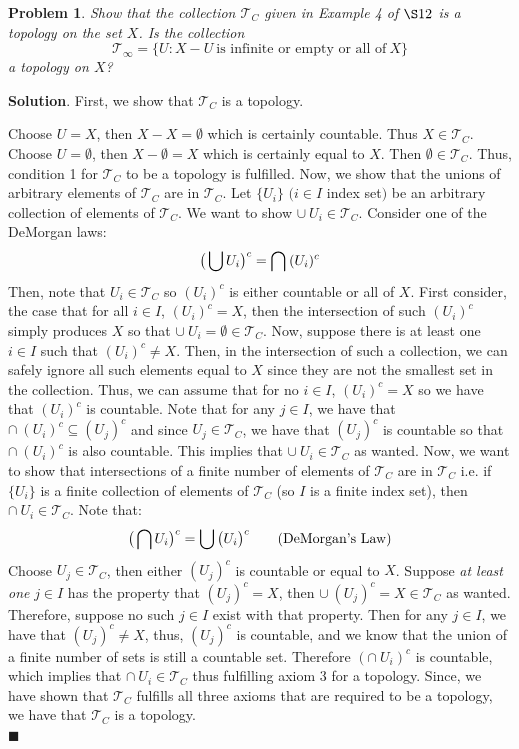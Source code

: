 \documentclass[12pt]{article}
\renewcommand{\=}[1]{\stackrel{#1}{=}} %
\providecommand{\T}{\mathcal{T}}
\newtheorem{p}{Problem}[section]
\theoremstyle{definition}
\newenvironment{s}{%
        \begin{trivlist} \item \textbf{Solution}. }{%
            \hspace*{\fill} $\blacksquare$\end{trivlist}}%
\begin{document}
\newpage
\begin{p}
    Show that the collection $\T_C$ given in Example 4 of $\S 12$ is a topology on the set $X$. Is the collection
    \[ \T_{\infty} = \{U : X - U\:\text{is infinite or empty or all of}\:X\} \]
    a topology on $X$?
\end{p}
\begin{s}
    First, we show that $\T_C$ is a topology.

    Choose $U = X$, then $X - X = \emptyset$ which is certainly countable. Thus $X \in \T_C$.
    Choose $U = \emptyset$, then $X - \emptyset = X$ which is certainly equal to $X$. Then $\emptyset\in \T_C$.
    Thus, condition 1 for $\T_C$ to be a topology is fulfilled. Now, we show that the unions of arbitrary elements of $\T_C$
    are in $\T_C$. Let $\{U_i\}$ $(i\in I$ index set$)$ be an arbitrary collection of elements of $\T_C$. We want to show $\cup\:U_i\in\T_C$.
    Consider one of the DeMorgan laws:
    \begin{align*}
        \big{(}\bigcup U_i\big{)}^c = \bigcap\: (U_i)^c
    \end{align*}
    Then, note that $U_i\in\T_C$ so $(U_i)^c$ is either countable or all of $X$. First consider, the case that for all $i\in I$, $(U_i)^c = X$, then
    the intersection of such $(U_i)^c$ simply produces $X$ so that $\cup\: U_i = \emptyset \in \T_C$. Now, suppose there is at least one $i\in I$ such that $(U_i)^c \neq X$.
    Then, in the intersection of such a collection, we can safely ignore all such elements equal to $X$ since they are not the smallest set in the collection.
    Thus, we can assume that for no $i\in I$, $(U_i)^c = X$ so we have that $(U_i)^c$ is countable. Note that for any $j\in I$, we have that
    $\cap\:(U_i)^c \subseteq (U_j)^c$ and since $U_j\in\T_C$, we have that $(U_j)^c$ is countable so that $\cap\:(U_i)^c$ is also countable.
    This implies that $\cup\:U_i\in\T_C$ as wanted. Now, we want to show that intersections of a finite number
    of elements of $\T_C$ are in $\T_C$ i.e. if $\{U_i\}$ is a finite collection of elements of $\T_C$ (so $I$ is a finite index set), then $\cap\: U_i \in \T_C$.
    Note that:
    \[ \big{(}\bigcap U_i\big{)}^c = \bigcup \big{(}U_i\big{)}^c \qquad (\text{DeMorgan's Law})\]
    Choose $U_j\in\T_C$, then either $(U_j)^c$ is countable or equal to $X$. Suppose \textit{at least one} $j\in I$ has the property that $(U_j)^c = X$, then
    $\cup\:(U_j)^c = X \in \T_C$ as wanted. Therefore, suppose no such $j\in I$ exist with that property. Then for any $j\in I$, we have that $(U_j)^c \neq X$, 
    thus, $(U_j)^c$ is countable, and we know that
    the union of a finite number of sets is still a countable set. Therefore $(\cap\:U_i)^c$ is countable, which implies that
    $\cap\: U_i \in \T_C$ thus fulfilling axiom 3 for a topology. Since, we have shown that $\T_C$ fulfills all three axioms that are required to be a topology, 
    we have that $\T_C$ is a topology. \\


\end{s}
\end{document}
